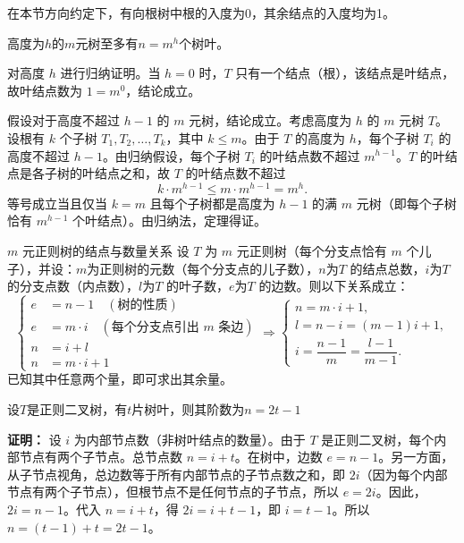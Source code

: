 在本节方向约定下，有向根树中根的入度为0，其余结点的入度均为1。

\begin{theorem}{}{}
    高度为$h$的$m$元树至多有$n=m^h$个树叶。
\end{theorem}
对高度 $h$ 进行归纳证明。当 $h=0$ 时，$T$ 只有一个结点（根），该结点是叶结点，故叶结点数为 $1 = m^0$，结论成立。

假设对于高度不超过 $h-1$ 的 $m$ 元树，结论成立。考虑高度为 $h$ 的 $m$ 元树 $T$。设根有 $k$ 个子树 $T_1, T_2, \dots, T_k$，其中 $k \le m$。由于 $T$ 的高度为 $h$，每个子树 $T_i$ 的高度不超过 $h-1$。由归纳假设，每个子树 $T_i$ 的叶结点数不超过 $m^{h-1}$。$T$ 的叶结点是各子树的叶结点之和，故 $T$ 的叶结点数不超过
    \[
    k \cdot m^{h-1} \le m \cdot m^{h-1} = m^h.
    \]
等号成立当且仅当 $k=m$ 且每个子树都是高度为 $h-1$ 的满 $m$ 元树（即每个子树恰有 $m^{h-1}$ 个叶结点）。由归纳法，定理得证。
\begin{theorem}{$m$ 元正则树的结点与数量关系}{}
设 $T$ 为 $m$ 元正则树（每个分支点恰有 $m$ 个儿子），并设：$m$为正则树的元数（每个分支点的儿子数），$n$为$T$ 的结点总数，$i$为$T$ 的分支点数（内点数），$l$为$T$ 的叶子数，$e$为$T$ 的边数。则以下关系成立：
\[\begin{cases}
    e &= n - 1 \quad (\text{树的性质}) \\[-3pt]
    e &= m \cdot i \quad (\text{每个分支点引出 $m$ 条边}) \\[-3pt]
    n &= i + l \\[-3pt]
    n &= m \cdot i + 1
\end{cases}
\Rightarrow
\begin{cases}
    n = m \cdot i + 1,\\[-3pt]
    l = n - i = (m-1)i + 1,\\
    i = \dfrac{n-1}{m} = \dfrac{l-1}{m-1}.
\end{cases}
\]
已知其中任意两个量，即可求出其余量。
\end{theorem}
\begin{example}{}{}
    设$T$是正则二叉树，有$t$片树叶，则其阶数为$n=2t-1$
\end{example}
\textbf{证明：} 设 $i$ 为内部节点数（非树叶结点的数量）。由于 $T$ 是正则二叉树，每个内部节点有两个子节点。总节点数 $n = i + t$。在树中，边数 $e = n - 1$。另一方面，从子节点视角，总边数等于所有内部节点的子节点数之和，即 $2i$（因为每个内部节点有两个子节点），但根节点不是任何节点的子节点，所以 $e = 2i$。因此，$2i = n - 1$。代入 $n = i + t$，得 $2i = i + t - 1$，即 $i = t - 1$。所以 $n = (t - 1) + t = 2t - 1$。

